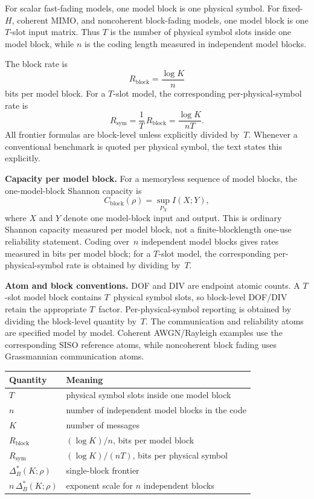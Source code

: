\documentclass[lettersize,onecolumn]{IEEEtran}
\newcommand{\snr}{\rho}
\begin{document}
For scalar fast-fading models, one model block is one physical
symbol. For fixed-$H$, coherent MIMO, and noncoherent block-fading
models, one model block is one $T$-slot input matrix. Thus $T$ is
the number of physical symbol slots inside one model block, while
$n$ is the coding length measured in independent model blocks.

The block rate is
\[
  R_{\mathrm{block}} = \frac{\log K}{n}
\]
bits per model block. For a $T$-slot model, the corresponding
per-physical-symbol rate is
\[
  R_{\mathrm{sym}} = \frac{1}{T}\,R_{\mathrm{block}}
  = \frac{\log K}{nT}.
\]
All frontier formulas are block-level unless explicitly divided
by~$T$. Whenever a conventional benchmark is quoted per physical
symbol, the text states this explicitly.

\textbf{Capacity per model block.}
For a memoryless sequence of model blocks, the one-model-block
Shannon capacity is
\[
C_{\mathrm{block}}(\snr) = \sup_{P_X} I(X;Y),
\]
where $X$ and $Y$ denote one model-block input and output. This is
ordinary Shannon capacity measured per model block, not a
finite-blocklength one-use reliability statement. Coding over~$n$
independent model blocks gives rates measured in bits per model block;
for a $T$-slot model, the corresponding per-physical-symbol rate is
obtained by dividing by~$T$.

\textbf{Atom and block conventions.}
DOF and DIV are endpoint atomic counts. A $T$-slot model block
contains $T$~physical symbol slots, so block-level DOF/DIV retain
the appropriate $T$~factor. Per-physical-symbol reporting is obtained
by dividing the block-level quantity by~$T$. The communication and reliability atoms are specified model by model. Coherent AWGN/Rayleigh
examples use the corresponding SISO reference atoms, while
noncoherent block fading uses Grassmannian communication atoms.

\begin{center}
\small
\begin{tabular}{@{}ll@{}}
\toprule
Quantity & Meaning \\
\midrule
$T$ & physical symbol slots inside one model block \\
$n$ & number of independent model blocks in the code \\
$K$ & number of messages \\
$R_{\mathrm{block}}$ & $(\log K)/n$, bits per model block \\
$R_{\mathrm{sym}}$ & $(\log K)/(nT)$, bits per physical symbol \\
$\Delta_B^*(K;\snr)$ & single-block frontier \\
$n\,\Delta_B^*(K;\snr)$ & exponent scale for $n$ independent blocks \\
\bottomrule
\end{tabular}
\end{center}
\end{document}
